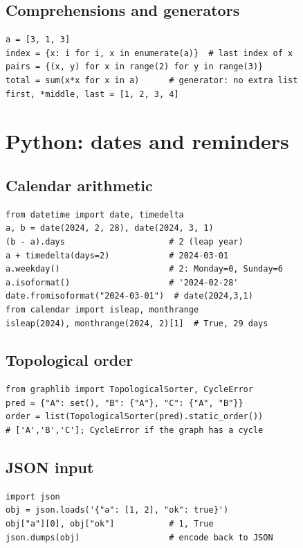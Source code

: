 \subsection{Comprehensions and generators}
\begin{lstlisting}[label=py:comprehensions]
a = [3, 1, 3]
index = {x: i for i, x in enumerate(a)}  # last index of x
pairs = {(x, y) for x in range(2) for y in range(3)}
total = sum(x*x for x in a)      # generator: no extra list
first, *middle, last = [1, 2, 3, 4]
\end{lstlisting}

\section{Python: dates and reminders}

\subsection{Calendar arithmetic}
\begin{lstlisting}[label=py:dates]
from datetime import date, timedelta
a, b = date(2024, 2, 28), date(2024, 3, 1)
(b - a).days                     # 2 (leap year)
a + timedelta(days=2)            # 2024-03-01
a.weekday()                      # 2: Monday=0, Sunday=6
a.isoformat()                    # '2024-02-28'
date.fromisoformat("2024-03-01")  # date(2024,3,1)
from calendar import isleap, monthrange
isleap(2024), monthrange(2024, 2)[1]  # True, 29 days
\end{lstlisting}

\subsection{Topological order}
\begin{lstlisting}[label=py:topological]
from graphlib import TopologicalSorter, CycleError
pred = {"A": set(), "B": {"A"}, "C": {"A", "B"}}
order = list(TopologicalSorter(pred).static_order())
# ['A','B','C']; CycleError if the graph has a cycle
\end{lstlisting}

\subsection{JSON input}
\begin{lstlisting}[label=py:json]
import json
obj = json.loads('{"a": [1, 2], "ok": true}')
obj["a"][0], obj["ok"]           # 1, True
json.dumps(obj)                  # encode back to JSON
\end{lstlisting}

